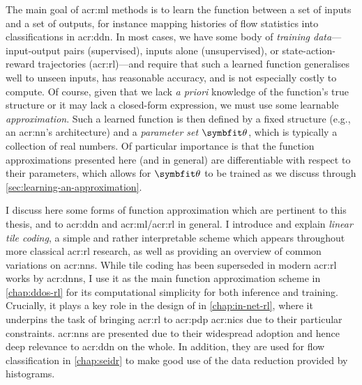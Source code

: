 The main goal of \gls{acr:ml} methods is to learn the function between a set of inputs and a set of outputs, for instance mapping histories of flow statistics into classifications in \gls{acr:ddn}.
In most cases, we have some body of \emph{training data}---input-output pairs (supervised), inputs alone (unsupervised), or state-action-reward trajectories (\gls{acr:rl})---and require that such a learned function generalises well to unseen inputs, has reasonable accuracy, and is not especially costly to compute.
Of course, given that we lack \emph{a priori} knowledge of the function's true structure or it may lack a closed-form expression, we must use some learnable \emph{approximation}.
Such a learned function is then defined by a fixed structure (e.g., an \gls{acr:nn}'s architecture) and a \emph{parameter set} $\wvec{}$, which is typically a collection of real numbers.
Of particular importance is that the function approximations presented here (and in general) are differentiable with respect to their parameters, which allows for $\wvec{}$ to be trained as we discuss through \cref{sec:learning-an-approximation}.

I discuss here some forms of function approximation which are pertinent to this thesis, and to \gls{acr:ddn} and \gls{acr:ml}/\gls{acr:rl} in general.
I introduce and explain \emph{linear tile coding}, a simple and rather interpretable scheme which appears throughout more classical \gls{acr:rl} research, as well as providing an overview of common variations on \glspl{acr:nn}.
While tile coding has been superseded in modern \gls{acr:rl} works by \glspl{acr:dnn}, I use it as the main function approximation scheme in \cref{chap:ddos-rl} for its computational simplicity for both inference and training.
Crucially, it plays a key role in the design of \approachshort{} in \cref{chap:in-net-rl}, where it underpins the task of bringing \gls{acr:rl} to \gls{acr:pdp} \glspl{acr:nic} due to their particular constraints.
\glspl{acr:nn} are presented due to their widespread adoption and hence deep relevance to \gls{acr:ddn} on the whole.
In addition, they are used for flow classification in \cref{chap:seidr} to make good use of the data reduction provided by \seidr{} histograms.

%
%
%
%
%
%
%
%

